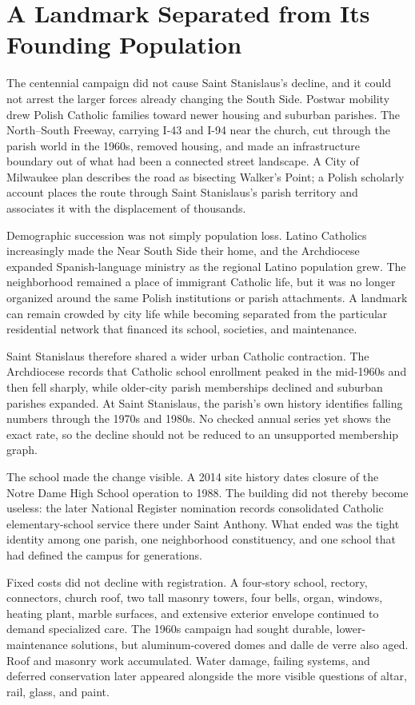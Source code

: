 \section{A Landmark Separated from Its Founding Population}

The centennial campaign did not cause Saint Stanislaus's decline, and it could not arrest the larger forces already changing the South Side. Postwar mobility drew Polish Catholic families toward newer housing and suburban parishes. The North--South Freeway, carrying I-43 and I-94 near the church, cut through the parish world in the 1960s, removed housing, and made an infrastructure boundary out of what had been a connected street landscape. A City of Milwaukee plan describes the road as bisecting Walker's Point; a Polish scholarly account places the route through Saint Stanislaus's parish territory and associates it with the displacement of thousands.

Demographic succession was not simply population loss. Latino Catholics increasingly made the Near South Side their home, and the Archdiocese expanded Spanish-language ministry as the regional Latino population grew. The neighborhood remained a place of immigrant Catholic life, but it was no longer organized around the same Polish institutions or parish attachments. A landmark can remain crowded by city life while becoming separated from the particular residential network that financed its school, societies, and maintenance.

Saint Stanislaus therefore shared a wider urban Catholic contraction. The Archdiocese records that Catholic school enrollment peaked in the mid-1960s and then fell sharply, while older-city parish memberships declined and suburban parishes expanded. At Saint Stanislaus, the parish's own history identifies falling numbers through the 1970s and 1980s. No checked annual series yet shows the exact rate, so the decline should not be reduced to an unsupported membership graph.

The school made the change visible. A 2014 site history dates closure of the Notre Dame High School operation to 1988. The building did not thereby become useless: the later National Register nomination records consolidated Catholic elementary-school service there under Saint Anthony. What ended was the tight identity among one parish, one neighborhood constituency, and one school that had defined the campus for generations.

Fixed costs did not decline with registration. A four-story school, rectory, connectors, church roof, two tall masonry towers, four bells, organ, windows, heating plant, marble surfaces, and extensive exterior envelope continued to demand specialized care. The 1960s campaign had sought durable, lower-maintenance solutions, but aluminum-covered domes and dalle de verre also aged. Roof and masonry work accumulated. Water damage, failing systems, and deferred conservation later appeared alongside the more visible questions of altar, rail, glass, and paint.

